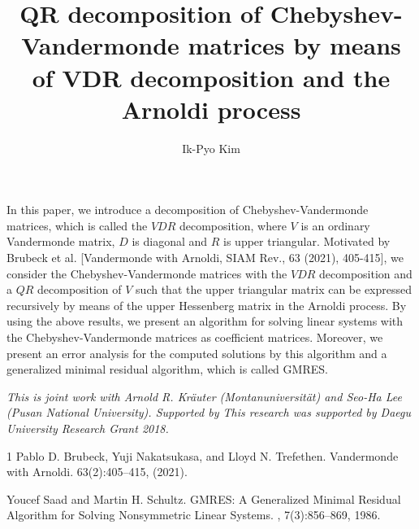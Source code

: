 \documentclass[a4paper]{amsart}
\date{}
\begin{document}
\title{QR decomposition of Chebyshev-Vandermonde matrices by means of VDR decomposition and the Arnoldi process}
\author{Ik-Pyo Kim} %
\address{Daegu University} %

\maketitle


 In this paper, we introduce a decomposition of Chebyshev-Vandermonde matrices, which is called the $VDR$ decomposition, where $V$ is an ordinary Vandermonde matrix, $D$ is diagonal and $R$ is upper triangular. Motivated by Brubeck et al. [Vandermonde with Arnoldi, SIAM Rev., 63 (2021), 405-415], we consider the Chebyshev-Vandermonde matrices with the $VDR$ decomposition and a $QR$ decomposition of $V$ such that the upper triangular matrix can be expressed recursively by means of the upper Hessenberg matrix in the Arnoldi process. By using the above results, we present an algorithm for solving linear systems with the Chebyshev-Vandermonde matrices as coefficient matrices. Moreover, we present an error analysis for the computed solutions by this algorithm and a generalized minimal residual algorithm, which is called GMRES.

\emph{This is joint work with Arnold R. Kr\"auter (Montanuniversit\"at) and Seo-Ha Lee (Pusan National University).
Supported by This research was supported by Daegu University Research Grant 2018.}

\begin{thebibliography}{1}
 Pablo D. Brubeck, Yuji Nakatsukasa, and Lloyd N. Trefethen.
\newblock Vandermonde with Arnoldi.
  63(2):405–415,  (2021).

Youcef Saad and  Martin H. Schultz.
\newblock GMRES: {A} {Generalized Minimal Residual Algorithm for Solving Nonsymmetric Linear Systems}.
, 7(3):856--869, 1986.
\end{thebibliography}
\end{document}

